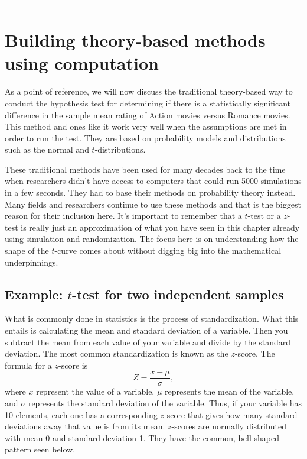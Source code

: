 \documentclass[12pt, krantz2,]{krantz}
\begin{document}
\begin{center}\rule{0.5\linewidth}{\linethickness}\end{center}

\hypertarget{theory-hypo}{%
\section{Building theory-based methods using computation}\label{theory-hypo}}

As a point of reference, we will now discuss the traditional theory-based way to conduct the hypothesis test for determining if there is a statistically significant difference in the sample mean rating of Action movies versus Romance movies. This method and ones like it work very well when the assumptions are met in order to run the test. They are based on probability models and distributions such as the normal and \(t\)-distributions.

These traditional methods have been used for many decades back to the time when researchers didn't have access to computers that could run 5000 simulations in a few seconds. They had to base their methods on probability theory instead. Many fields and researchers continue to use these methods and that is the biggest reason for their inclusion here. It's important to remember that a \(t\)-test or a \(z\)-test is really just an approximation of what you have seen in this chapter already using simulation and randomization. The focus here is on understanding how the shape of the \(t\)-curve comes about without digging big into the mathematical underpinnings.

\hypertarget{example-t-test-for-two-independent-samples}{%
\subsection{\texorpdfstring{Example: \(t\)-test for two independent samples}{Example: t-test for two independent samples}}\label{example-t-test-for-two-independent-samples}}

What is commonly done in statistics is the process of standardization. What this entails is calculating the mean and standard deviation of a variable. Then you subtract the mean from each value of your variable and divide by the standard deviation. The most common standardization is known as the \(z\)-score. The formula for a \(z\)-score is \[Z = \frac{x - \mu}{\sigma},\] where \(x\) represent the value of a variable, \(\mu\) represents the mean of the variable, and \(\sigma\) represents the standard deviation of the variable. Thus, if your variable has 10 elements, each one has a corresponding \(z\)-score that gives how many standard deviations away that value is from its mean. \(z\)-scores are normally distributed with mean 0 and standard deviation 1. They have the common, bell-shaped pattern seen below.
\end{document}

